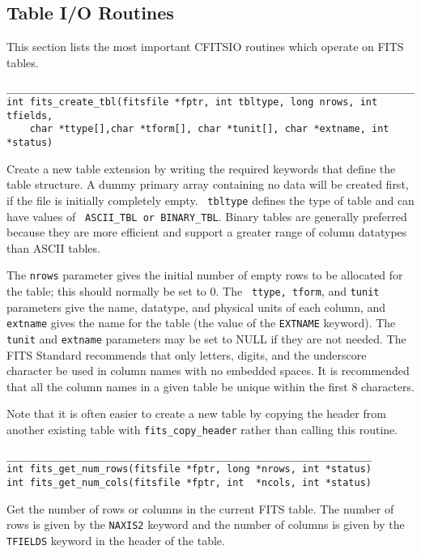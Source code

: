 \documentclass[11pt]{article}
\begin{document}
\newpage
\subsection{Table I/O Routines}

This section lists the most important CFITSIO routines which operate on
FITS tables.

\begin{verbatim}
__________________________________________________________________________
int fits_create_tbl(fitsfile *fptr, int tbltype, long nrows, int tfields,
    char *ttype[],char *tform[], char *tunit[], char *extname, int *status)
\end{verbatim}

Create a new  table extension by writing the required keywords that
define the table structure. A dummy primary array containing no data
will be created first, if the file is initially completely empty.  {\tt
tbltype} defines the type of table and can have values of {\tt
ASCII\_TBL or BINARY\_TBL}.  Binary tables are generally preferred
because they are more efficient and support a greater range of column
datatypes than ASCII tables.

The {\tt nrows} parameter gives the initial number of empty rows to be
allocated for the table; this should normally be set to 0.  The {\tt
ttype, tform}, and {\tt tunit} parameters give the name, datatype, and
physical units of each column, and {\tt extname} gives the name for the
table (the value of the {\tt EXTNAME} keyword). The {\tt
tunit} and {\tt extname} parameters may be set to NULL
if they are not needed.  The FITS Standard recommends that only
letters, digits, and the underscore character be used in column names
with no embedded spaces.  It is recommended that all the column names
in a given table be unique within the first 8 characters.

Note that it is often easier to create a new table by copying the
header from another existing table with {\tt fits\_copy\_header} rather
than calling this routine.

\begin{verbatim}
_______________________________________________________________
int fits_get_num_rows(fitsfile *fptr, long *nrows, int *status)
int fits_get_num_cols(fitsfile *fptr, int  *ncols, int *status)
\end{verbatim}

Get the number of rows or columns in the current FITS table.  The
number of rows is given by the {\tt NAXIS2} keyword and the number of columns
is given by the {\tt TFIELDS} keyword in the header of the table.
\end{document}
